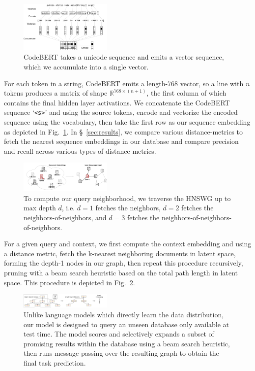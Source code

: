 \documentclass[sigconf]{acmart}
\begin{document}
  \begin{figure}[H]
    \centering
    \includegraphics[width=0.40\textwidth]{figs/bert_embedding}
    \caption{CodeBERT takes a unicode sequence and emits a vector sequence, which we accumulate into a single vector.}
    \label{fig:bert}
  \end{figure}

  For each token in a string, CodeBERT emits a length-768 vector, so a line with $n$ tokens produces a matrix of shape $\mathbb R^{768 \times (n + 1)}$, the first column of which contains the final hidden layer activations. We concatenate the CodeBERT sequence `\texttt{<s>}' and using the source tokens, encode and vectorize the encoded sequence using the vocabulary, then take the first row as our sequence embedding as depicted in Fig.~\ref{fig:bert}. In \S~\ref{sec:results}, we compare various distance-metrics to fetch the nearest sequence embeddings in our database and compare precision and recall across various types of distance metrics.

  \begin{figure}[H]
    \centering
    \includegraphics[width=0.4\textwidth]{figs/latent_kg}
    \caption{To compute our query neighborhood, we traverse the HNSWG up to max depth $d$, i.e. $d=1$ fetches the neighbors, $d=2$ fetches the neighbors-of-neighbors, and $d=3$ fetches the neighbors-of-neighbors-of-neighbors.}
    \label{fig:de2kg}
  \end{figure}

  For a given query and context, we first compute the context embedding and using a distance metric, fetch the k-nearest neighboring documents in latent space, forming the depth-1 nodes in our graph, then repeat this procedure recursively, pruning with a beam search heuristic based on the total path length in latent space. This procedure is depicted in Fig.~\ref{fig:de2kg}.

  \begin{figure}[H]
    \centering
    \includegraphics[width=0.4\textwidth]{figs/architecture}
    \caption{Unlike language models which directly learn the data distribution, our model is designed to query an unseen database only available at test time. The model scores and selectively expands a subset of promising results within the database using a beam search heuristic, then runs message passing over the resulting graph to obtain the final task prediction.}
    \label{fig:architecture}
  \end{figure}
\end{document}
